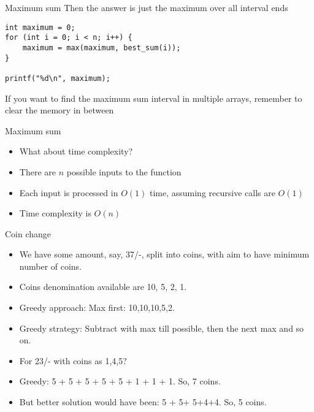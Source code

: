    \begin{frame}[fragile]{Maximum sum}
Then the answer is just the maximum over all interval ends


    \begin{lstlisting}
int maximum = 0;
for (int i = 0; i < n; i++) {
    maximum = max(maximum, best_sum(i));
}

printf("%d\n", maximum);
    \end{lstlisting}
    If you want to find the maximum sum interval in multiple arrays, remember to clear the memory in between
\end{frame}

   \begin{frame}[fragile]{Maximum sum}
    \begin{itemize}
        \item What about time complexity?
        \item There are $n$ possible inputs to the function
        \item Each input is processed in $O(1)$ time, assuming recursive calls are $O(1)$
        \item Time complexity is $O(n)$
    \end{itemize}
\end{frame}

   \begin{frame}[fragile]{Coin change}
    \begin{itemize}
\item We have some amount, say, 37/-, split into coins, with aim to have minimum number of coins. 
\item Coins denomination available are 10, 5, 2, 1.
\item Greedy approach: Max first: 10,10,10,5,2. 
\item Greedy strategy: Subtract with max till possible, then the next max and so on.
\item For 23/- with coins as 1,4,5?
\item Greedy: 5 + 5 + 5 + 5 + 5 + 1 + 1 + 1. So, 7 coins.
\item But better solution would have been: 5 + 5+ 5+4+4. So, 5 coins.
    \end{itemize}
\end{frame}



